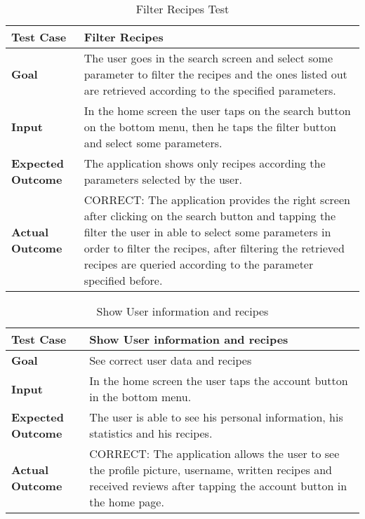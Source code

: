 \begin{table}[H]
	\centering
	\begin{tabular}{|l|l|}
	\hline
	\textbf{Test Case}& Filter Recipes\\
	\hline
	\textbf{Goal}& 
	\begin{minipage}{.7\linewidth}
	The user goes in the search screen and select some parameter to filter the recipes and the ones listed out are retrieved according to the specified parameters.
	\end{minipage}\\
	\hline
	\textbf{Input}& 
	\begin{minipage}{.7\linewidth}
	In the home screen the user taps on the search button on the bottom menu, then he taps the filter button and select some parameters.
	\end{minipage}\\
	\hline
	\textbf{Expected Outcome}& 
	\begin{minipage}{.7\linewidth}
	The application shows only recipes according the parameters selected by the user.
	\end{minipage}\\
	\hline
	\textbf{Actual Outcome}& 
	\begin{minipage}{.7\linewidth}
	CORRECT: The application provides the right screen after clicking on the search button and tapping the filter the user in able to select some parameters in order to filter the recipes, after filtering the retrieved recipes are queried according to the parameter specified before.
	\end{minipage}\\
	\hline	
	\end{tabular}
	\caption{Filter Recipes Test}
\end{table}

\begin{table}[H]
	\centering
	\begin{tabular}{|l|l|}
	\hline
	\textbf{Test Case}& Show User information and recipes\\
	\hline
	\textbf{Goal}& See correct user data and recipes\\
	\hline
	\textbf{Input}& 
	\begin{minipage}{.7\linewidth}
	In the home screen the user taps the account button in the bottom menu.
	\end{minipage}\\
	\hline
	\textbf{Expected Outcome}& 
	\begin{minipage}{.7\linewidth}
	The user is able to see his personal information, his statistics and his recipes.
	\end{minipage}\\
	\hline
	\textbf{Actual Outcome}&
	\begin{minipage}{.7\linewidth}
	CORRECT: The application allows the user to see the profile picture, username, written recipes and received reviews after tapping the account button in the home page.
	\end{minipage}\\
	\hline	
	\end{tabular}
	\caption{Show User information and recipes}
\end{table}

